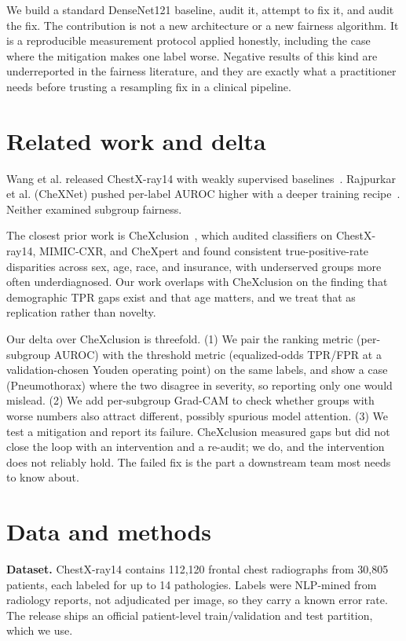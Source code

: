 \documentclass[11pt]{article}
\begin{document}
We build a standard DenseNet121 baseline, audit it, attempt to fix it, and audit the fix. The contribution is not a new architecture or a new fairness algorithm. It is a reproducible measurement protocol applied honestly, including the case where the mitigation makes one label worse. Negative results of this kind are underreported in the fairness literature, and they are exactly what a practitioner needs before trusting a resampling fix in a clinical pipeline.

\section{Related work and delta}

Wang et al. released ChestX-ray14 with weakly supervised baselines~\cite{wang2017}. Rajpurkar et al. (CheXNet) pushed per-label AUROC higher with a deeper training recipe~\cite{rajpurkar2017}. Neither examined subgroup fairness.

The closest prior work is CheXclusion~\cite{seyyed2021}, which audited classifiers on ChestX-ray14, MIMIC-CXR, and CheXpert and found consistent true-positive-rate disparities across sex, age, race, and insurance, with underserved groups more often underdiagnosed. Our work overlaps with CheXclusion on the finding that demographic TPR gaps exist and that age matters, and we treat that as replication rather than novelty.

Our delta over CheXclusion is threefold. (1) We pair the ranking metric (per-subgroup AUROC) with the threshold metric (equalized-odds TPR/FPR at a validation-chosen Youden operating point) on the same labels, and show a case (Pneumothorax) where the two disagree in severity, so reporting only one would mislead. (2) We add per-subgroup Grad-CAM to check whether groups with worse numbers also attract different, possibly spurious model attention. (3) We test a mitigation and report its failure. CheXclusion measured gaps but did not close the loop with an intervention and a re-audit; we do, and the intervention does not reliably hold. The failed fix is the part a downstream team most needs to know about.

\section{Data and methods}

\textbf{Dataset.} ChestX-ray14 contains 112,120 frontal chest radiographs from 30,805 patients, each labeled for up to 14 pathologies. Labels were NLP-mined from radiology reports, not adjudicated per image, so they carry a known error rate. The release ships an official patient-level train/validation and test partition, which we use.
\end{document}
